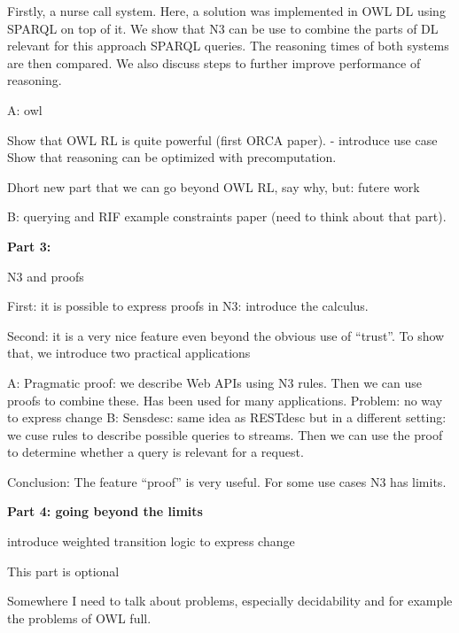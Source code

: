 Firstly, a nurse call system. Here, a solution was implemented in OWL DL using SPARQL on top of it. We show that N3 can be use to combine the parts of DL relevant for this approach SPARQL queries. 
The reasoning times of both systems are then compared. We also discuss steps to further improve performance of reasoning.  


A: owl

Show that OWL RL is quite powerful (first ORCA paper).
 - introduce use case
Show that reasoning can be optimized with precomputation.

Dhort new part that we can go beyond OWL RL, say why, but: futere work

B: querying and RIF
example constraints paper (need to think about that part).

\textbf{Part 3:}

N3 and proofs

First: it is possible to express proofs in N3: introduce the calculus.

Second: it is a very nice feature even beyond the obvious use of ``trust''. To show that, we introduce two practical applications

A: Pragmatic proof: we describe Web APIs using N3 rules. Then we can use proofs to combine these. Has been used for many applications. Problem: no way to express change
B: Sensdesc: same idea as RESTdesc but in a different setting: we cuse rules to describe possible queries to streams. Then we can use the proof to determine whether a query is relevant for a request.

Conclusion: The feature ``proof'' is very useful. For some use cases N3 has limits.

\textbf{Part 4: going beyond the limits}

introduce weighted transition logic to express change

This part is optional



Somewhere I need to talk about problems, especially decidability and for example the problems of OWL full.